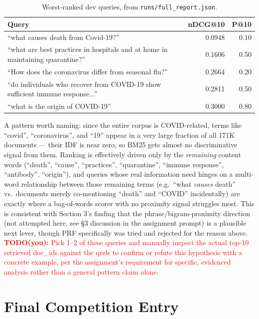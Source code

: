 \documentclass[11pt]{article}
\newcommand{\todo}[1]{\textcolor{red}{\textbf{TODO(you):} #1}}
\begin{document}
\begin{table}[h]
\centering
\small
\begin{tabular}{p{9.5cm}rr}
\toprule
Query & nDCG@10 & P@10 \\
\midrule
``what causes death from Covid-19?'' & 0.0948 & 0.10 \\
``what are best practices in hospitals and at home in maintaining quarantine?'' & 0.1606 & 0.50 \\
``How does the coronavirus differ from seasonal flu?'' & 0.2664 & 0.20 \\
``do individuals who recover from COVID-19 show sufficient immune response...'' & 0.2811 & 0.50 \\
``what is the origin of COVID-19'' & 0.3000 & 0.80 \\
\bottomrule
\end{tabular}
\caption{Worst-ranked dev queries, from \texttt{runs/full\_report.json}.}
\end{table}

A pattern worth naming: since the entire corpus is COVID-related, terms
like ``covid'', ``coronavirus'', and ``19'' appear in a very large
fraction of all 171K documents --- their IDF is near zero, so BM25 gets
almost no discriminative signal from them. Ranking is effectively driven
only by the \emph{remaining} content words (``death'', ``cause'',
``practices'', ``quarantine'', ``immune response'', ``antibody'',
``origin''), and queries whose real information need hinges on a
multi-word relationship between those remaining terms (e.g.\ ``what
\emph{causes} death'' vs.\ documents merely co-mentioning ``death'' and
``COVID'' incidentally) are exactly where a bag-of-words scorer with no
proximity signal struggles most. This is consistent with Section 3's
finding that the phrase/bigram-proximity direction (not attempted here,
see \S 3 discussion in the assignment prompt) is a plausible next lever,
though PRF specifically was tried and rejected for the reason above.
\todo{Pick 1--2 of these queries and manually inspect the actual top-10
retrieved doc\_ids against the qrels to confirm or refute this
hypothesis with a concrete example, per the assignment's requirement for
specific, evidenced analysis rather than a general pattern claim alone.}

\section{Final Competition Entry}
\end{document}
